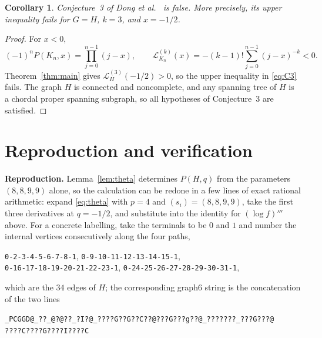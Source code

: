 \documentclass[11pt]{amsart}
\newtheorem{corollary}[theorem]{Corollary}
\theoremstyle{remark}
\newcommand{\Lfun}{\mathcal L}
\begin{document}
\begin{corollary}\label{cor:C3}
Conjecture~3 of Dong et al.\ \cite[Conjecture~3]{DongEtAl} is false. More
precisely, its upper inequality fails for $G=H$, $k=3$, and $x=-1/2$.
\end{corollary}

\begin{proof}
For $x<0$,
\[
 (-1)^nP(K_n,x)=\prod_{j=0}^{n-1}(j-x),
 \qquad
 \Lfun_{K_n}^{(k)}(x)
 =-(k-1)!\sum_{j=0}^{n-1}(j-x)^{-k}<0.
\]
Theorem~\ref{thm:main} gives
$\Lfun_H^{(3)}(-1/2)>0$, so the upper inequality in \eqref{eq:C3} fails.
The graph $H$ is connected and noncomplete, and any spanning tree of $H$ is
a chordal proper spanning subgraph, so all hypotheses of Conjecture~3 are
satisfied.
\end{proof}

\section{Reproduction and verification}

\noindent\textbf{Reproduction.}
Lemma~\ref{lem:theta} determines $P(H,q)$ from the parameters $(8,8,9,9)$
alone, so the calculation can be redone in a few lines of exact rational
arithmetic: expand \eqref{eq:theta} with $p=4$ and $(s_i)=(8,8,9,9)$, take the
first three derivatives at $q=-1/2$, and substitute into the identity for
$(\log f)'''$ above. For a concrete labelling, take the terminals to be $0$
and $1$ and number the internal vertices consecutively along the four paths,
\begin{center}
\texttt{0-2-3-4-5-6-7-8-1},\qquad
\texttt{0-9-10-11-12-13-14-15-1},\\
\texttt{0-16-17-18-19-20-21-22-23-1},\qquad
\texttt{0-24-25-26-27-28-29-30-31-1},
\end{center}
which are the $34$ edges of $H$; the corresponding graph6 string is the
concatenation of the two lines
\begin{center}
\texttt{\_PCGGD@\_??\_@?@??\_?I?@\_????G??G??C??@???G???g??@\_???????\_???G???@}\\
\texttt{????C????G????I????C}
\end{center}
\end{document}
